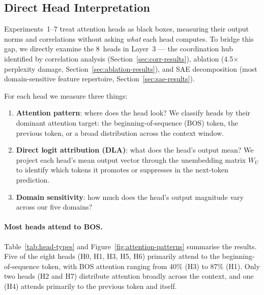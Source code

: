 \documentclass[11pt,a4paper]{article}
\begin{document}
\subsection{Direct Head Interpretation}
\label{sec:head-interp}

Experiments~1--7 treat attention heads as black boxes, measuring their output norms and correlations without asking \emph{what} each head computes.
To bridge this gap, we directly examine the 8~heads in Layer~3 --- the coordination hub identified by correlation analysis (Section~\ref{sec:corr-results}), ablation (4.5$\times$ perplexity damage, Section~\ref{sec:ablation-results}), and SAE decomposition (most domain-sensitive feature repertoire, Section~\ref{sec:sae-results}).

For each head we measure three things:
\begin{enumerate}[itemsep=2pt]
    \item \textbf{Attention pattern}: where does the head look? We classify heads by their dominant attention target: the beginning-of-sequence (BOS) token, the previous token, or a broad distribution across the context window.
    \item \textbf{Direct logit attribution (DLA)}: what does the head's output mean? We project each head's mean output vector through the unembedding matrix $W_U$ to identify which tokens it promotes or suppresses in the next-token prediction.
    \item \textbf{Domain sensitivity}: how much does the head's output magnitude vary across our five domains?
\end{enumerate}

\paragraph{Most heads attend to BOS.}
Table~\ref{tab:head-types} and Figure~\ref{fig:attention-patterns} summarise the results.
Five of the eight heads (H0, H1, H3, H5, H6) primarily attend to the beginning-of-sequence token, with BOS attention ranging from 40\% (H3) to 87\% (H1).
Only two heads (H2 and H7) distribute attention broadly across the context, and one (H4) attends primarily to the previous token and itself.
\end{document}

